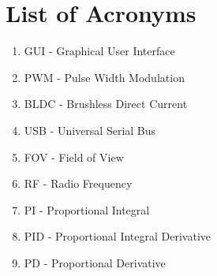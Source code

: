 \section{List of Acronyms}
\begin{enumerate}
	\item GUI - Graphical User Interface
	\item PWM - Pulse Width Modulation
	\item BLDC - Brushless Direct Current
	\item USB - Universal Serial Bus
	\item FOV - Field of View
	\item RF - Radio Frequency
	\item PI - Proportional Integral
	\item PID - Proportional Integral Derivative
	\item PD - Proportional Derivative
\end{enumerate}
